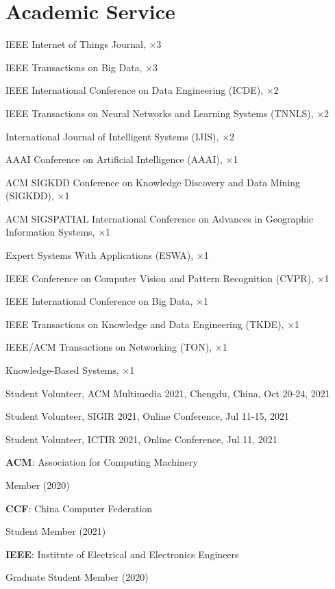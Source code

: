 \section*{Academic Service}


\indent

IEEE Internet of Things Journal, $\times$3

IEEE Transactions on Big Data, $\times$3

IEEE International Conference on Data Engineering (ICDE), $\times$2

IEEE Transactions on Neural Networks and Learning Systems (TNNLS), $\times$2

International Journal of Intelligent Systems (IJIS), $\times$2

AAAI Conference on Artificial Intelligence (AAAI), $\times$1

ACM SIGKDD Conference on Knowledge Discovery and Data Mining (SIGKDD), $\times$1

ACM SIGSPATIAL International Conference on Advances in Geographic Information Systems, $\times$1

Expert Systems With Applications (ESWA), $\times$1

IEEE Conference on Computer Vision and Pattern Recognition (CVPR), $\times$1

IEEE International Conference on Big Data, $\times$1

IEEE Transactions on Knowledge and Data Engineering (TKDE), $\times$1

IEEE/ACM Transactions on Networking (TON), $\times$1

Knowledge-Based Systems, $\times$1

\indent 

Student Volunteer, ACM Multimedia 2021, Chengdu, China, Oct 20-24, 2021

Student Volunteer, SIGIR 2021, Online Conference, Jul 11-15, 2021

Student Volunteer, ICTIR 2021, Online Conference, Jul 11, 2021

\indent 

\textbf{ACM}: Association for Computing Machinery 

\hspace{2em}Member (2020)

\textbf{CCF}: China Computer Federation

\hspace{2em}Student Member (2021)

\textbf{IEEE}: Institute of Electrical and Electronics Engineers

\hspace{2em}Graduate Student Member (2020)